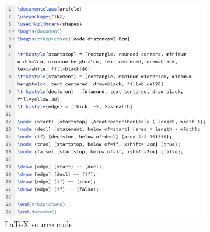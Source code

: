 \begin{figure}[ht]
\centering
\begin{subfigure}{.6\linewidth}
  \centering
  \includegraphics[width=\textwidth]{assets/AGTI_IBP_s.png}
  \caption{LaTeX source code}
  \label{fig:AGTI_IBP_source_code}
\end{subfigure}\hfill
\begin{subfigure}{.3\linewidth}
  \centering

\end{subfigure}
\end{figure}
